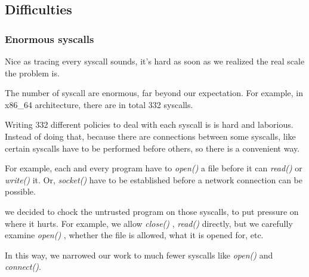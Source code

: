 \documentclass[conference,compsoc]{IEEEtran}
\begin{document}
	\subsection{Difficulties} %
		\subsubsection{Enormous syscalls}
			\par
				Nice as tracing every syscall sounds, it's hard as soon as we realized the real scale the problem is. 
			\par 
				The number of syscall are enormous, far beyond our expectation. 
				For example, in x86\_64 architecture, there are in total 332 syscalls. 
				\par
				Writing 332 different policies to deal with each syscall is is hard and laborious. Instead of doing that, because there are connections between some syscalls, like certain syscalls have to be performed before others, so there is a convenient way.
				\par
				For example, each and every program have to \emph{ open() } a file before it can \emph{read()} or \emph{write()} it. 
				Or, \emph{ socket() } have to be established before a network connection can be possible.
			\par
				we decided to chock the untrusted program on those syscalls, to put pressure on where it hurts. 
				For example, we allow \emph{ close() }, \emph{ read() } directly, but we carefully examine \emph{ open() }, whether the file is allowed, what it is opened for, etc.
			\par 
				In this way, we narrowed our work to much fewer syscalls like \emph{open()} and \emph{connect()}.
\end{document}
